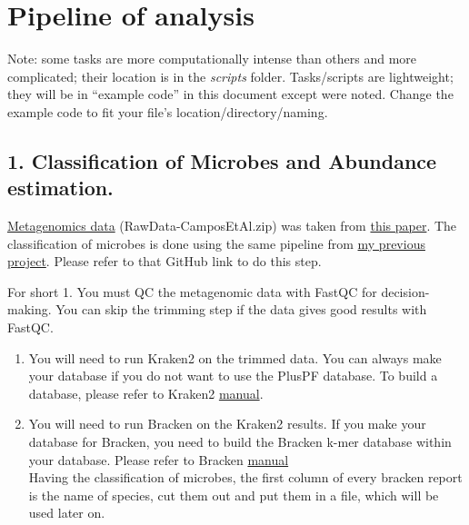 \documentclass[
]{article}
\author{}
\date{}
\begin{document}
\section{Pipeline of analysis}\label{pipeline-of-analysis}

Note: some tasks are more computationally intense than others and more
complicated; their location is in the \emph{scripts} folder.
Tasks/scripts are lightweight; they will be in ``example code'' in this
document except were noted. Change the example code to fit your file's
location/directory/naming.

\subsection{1. Classification of Microbes and Abundance
estimation.}\label{classification-of-microbes-and-abundance-estimation.}

\href{https://biorg.cs.fiu.edu/Smoking/}{Metagenomics data}
(RawData-CamposEtAl.zip) was taken from
\href{https://www.microbiologyresearch.org/content/journal/acmi/10.1099/acmi.0.000497.v3\#R52}{this
paper}. The classification of microbes is done using the same pipeline
from \href{https://github.com/npxhuy/microbiome}{my previous project}.
Please refer to that GitHub link to do this step.

For short 1. You must QC the metagenomic data with FastQC for
decision-making. You can skip the trimming step if the data gives good
results with FastQC.

\begin{enumerate}
\def\labelenumi{\arabic{enumi}.}
\setcounter{enumi}{1}
\item
  You will need to run Kraken2 on the trimmed data. You can always make
  your database if you do not want to use the PlusPF database. To build
  a database, please refer to Kraken2
  \href{https://github.com/DerrickWood/kraken2/blob/master/docs/MANUAL.markdown}{manual}.
\item
  You will need to run Bracken on the Kraken2 results. If you make your
  database for Bracken, you need to build the Bracken k-mer database
  within your database. Please refer to Bracken
  \href{https://github.com/jenniferlu717/Bracken}{manual}\\
  Having the classification of microbes, the first column of every
  bracken report is the name of species, cut them out and put them in a
  file, which will be used later on.
\end{enumerate}
\end{document}
